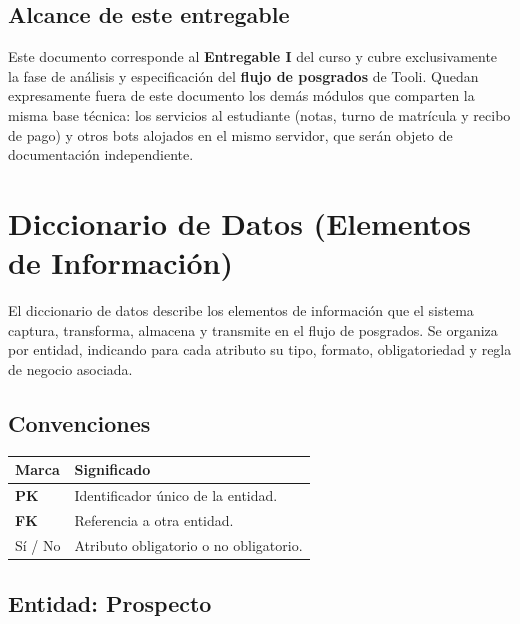 \documentclass[12pt,a4paper]{report}
\newcommand{\tablacompacta}{\setstretch{1.1}\small}
\begin{document}
\subsection{Alcance de este entregable}

Este documento corresponde al \textbf{Entregable I} del curso y cubre exclusivamente la fase de
análisis y especificación del \textbf{flujo de posgrados} de Tooli. Quedan expresamente fuera de
este documento los demás módulos que comparten la misma base técnica: los servicios al estudiante
(notas, turno de matrícula y recibo de pago) y otros bots alojados en el mismo servidor, que serán
objeto de documentación independiente.

\clearpage

\section{Diccionario de Datos (Elementos de Información)}

El diccionario de datos describe los elementos de información que el sistema captura, transforma,
almacena y transmite en el flujo de posgrados. Se organiza por entidad, indicando para cada atributo
su tipo, formato, obligatoriedad y regla de negocio asociada.

\subsection{Convenciones}

\begin{table}[H]
    \centering
    \tablacompacta
    \begin{tabular}{ll}
        \toprule
        \textbf{Marca} & \textbf{Significado} \\
        \midrule
        \textbf{PK} & Identificador único de la entidad. \\
        \textbf{FK} & Referencia a otra entidad. \\
        Sí / No & Atributo obligatorio o no obligatorio. \\
        \bottomrule
    \end{tabular}
\end{table}

\subsection{Entidad: Prospecto}
\end{document}
